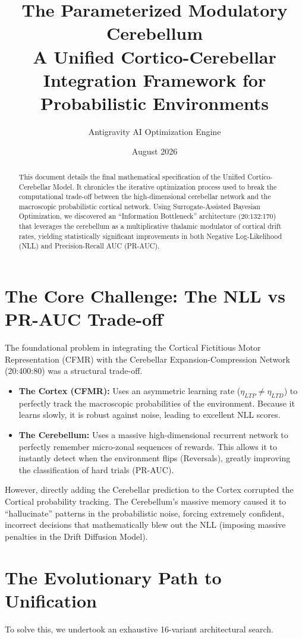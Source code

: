 \documentclass[11pt,a4paper]{article}
\title{\textbf{The Parameterized Modulatory Cerebellum} \\ \Large A Unified Cortico-Cerebellar Integration Framework for Probabilistic Environments}
\author{Antigravity AI Optimization Engine}
\date{August 2026}
\begin{document}
\maketitle

\begin{abstract}
This document details the final mathematical specification of the Unified Cortico-Cerebellar Model. It chronicles the iterative optimization process used to break the computational trade-off between the high-dimensional cerebellar network and the macroscopic probabilistic cortical network. Using Surrogate-Assisted Bayesian Optimization, we discovered an ``Information Bottleneck'' architecture (20:132:170) that leverages the cerebellum as a multiplicative thalamic modulator of cortical drift rates, yielding statistically significant improvements in both Negative Log-Likelihood (NLL) and Precision-Recall AUC (PR-AUC).
\end{abstract}

\section{The Core Challenge: The NLL vs PR-AUC Trade-off}
The foundational problem in integrating the Cortical Fictitious Motor Representation (CFMR) with the Cerebellar Expansion-Compression Network (20:400:80) was a structural trade-off. 
\begin{itemize}
    \item \textbf{The Cortex (CFMR):} Uses an asymmetric learning rate ($\eta_{LTP} \neq \eta_{LTD}$) to perfectly track the macroscopic probabilities of the environment. Because it learns slowly, it is robust against noise, leading to excellent NLL scores.
    \item \textbf{The Cerebellum:} Uses a massive high-dimensional recurrent network to perfectly remember micro-zonal sequences of rewards. This allows it to instantly detect when the environment flips (Reversals), greatly improving the classification of hard trials (PR-AUC).
\end{itemize}
However, directly adding the Cerebellar prediction to the Cortex corrupted the Cortical probability tracking. The Cerebellum's massive memory caused it to ``hallucinate'' patterns in the probabilistic noise, forcing extremely confident, incorrect decisions that mathematically blew out the NLL (imposing massive penalties in the Drift Diffusion Model).

\section{The Evolutionary Path to Unification}
To solve this, we undertook an exhaustive 16-variant architectural search.
\end{document}

